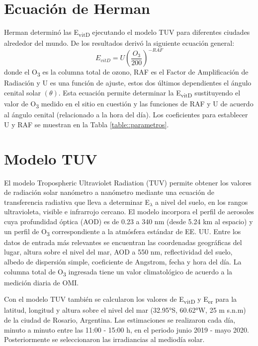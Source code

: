 \documentclass[10pt,twocolumn]{article}
\begin{document}
\section{Ecuación de Herman}
Herman\cite{Herman2010} determinó las E\textsubscript{vitD} ejecutando el modelo TUV para diferentes ciudades alrededor del mundo. De los resultados derivó la siguiente ecuación general:
\begin{equation}
  E_{vitD}=U\left(\frac{O_3}{200}\right)^{-RAF}
  \label{eq:evitd}
\end{equation}
donde el O\textsubscript{3} es la columna total de ozono, RAF es el Factor de Amplificación de Radiación y U es una función de ajuste, estos dos últimos dependientes el ángulo cenital solar $(\theta)$. Esta ecuación permite determinar la E\textsubscript{vitD} sustituyendo el valor de O\textsubscript{3} medido en el sitio en cuestión y las funciones de RAF y U de acuerdo al ángulo cenital (relacionado a la hora del día). Los coeficientes para establecer U y RAF se muestran en la Tabla \ref{table::parametros}.

\section{Modelo TUV}
El modelo Tropospheric Ultraviolet Radiation (TUV) permite obtener los valores de radiación solar nanómetro a nanómetro mediante una ecuación de transferencia radiativa que lleva a determinar E$_\lambda$ a nivel del suelo, en los rangos ultravioleta, visible e infrarrojo cercano. El modelo incorpora el perfil de aerosoles cuya profundidad óptica (AOD) es de 0.23 a 340 nm (desde 5.24 km al espacio) y un perfil de O\textsubscript{3} correspondiente a la atmósfera estándar de EE. UU. Entre los datos de entrada más relevantes se encuentran las coordenadas geográficas del lugar, altura sobre el nivel del mar, AOD a 550 nm, reflectividad del suelo, albedo de dispersión simple, coeficiente de Angstrom, fecha y hora del día. La columna total de O\textsubscript{3} ingresada tiene un valor climatológico de acuerdo a la medición diaria de OMI.

Con el modelo TUV también se calcularon los valores de E\textsubscript{vitD} y E\textsubscript{er} para la latitud, longitud y altura sobre el nivel del mar (32.95°S, 60.62°W, 25 m s.n.m) de la ciudad de Rosario, Argentina. Las estimaciones se realizaron cada día, minuto a minuto entre las 11:00 - 15:00 h, en el periodo junio 2019 - mayo 2020. Posteriormente se seleccionaron las irradiancias al mediodía solar.
\end{document}

